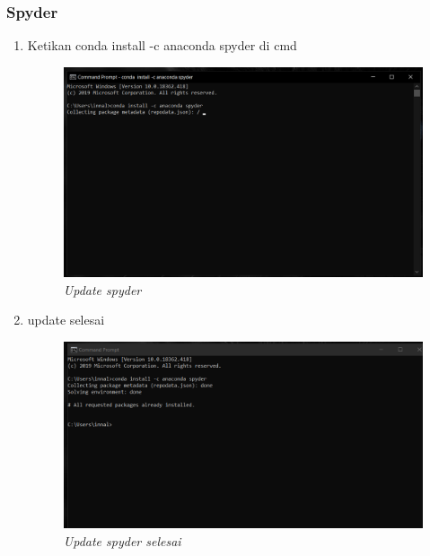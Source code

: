 \subsubsection{Spyder}
\begin{enumerate}
\item Ketikan conda install -c anaconda spyder di cmd
\begin{figure}[H]
    \centering
    \includegraphics[scale=0.4]{figures/updatespyder}
    \caption{\textit{Update spyder}}
    \label{Update spyder selesai}
\end{figure}
\item update selesai
\begin{figure}[H]
    \centering
    \includegraphics[scale=0.4]{figures/updatespyderselesai}
    \caption{\textit{Update spyder selesai}}
    \label{Update spyder selesai}
\end{figure}
\end{enumerate}

